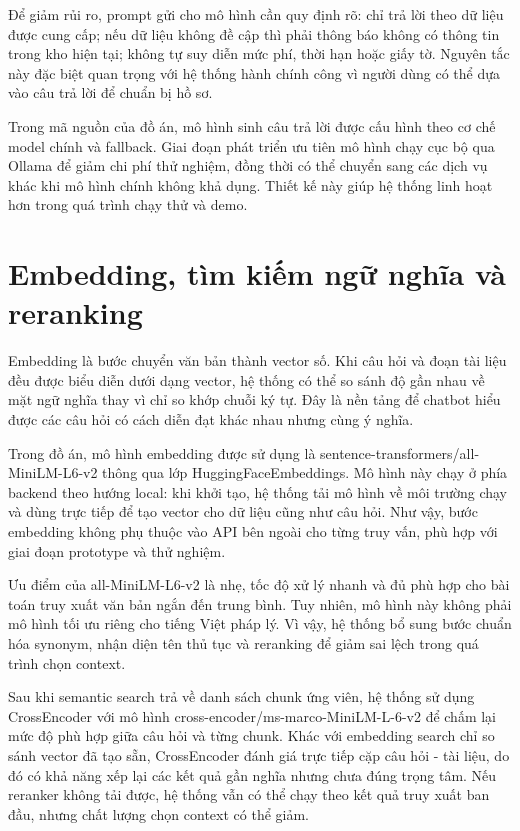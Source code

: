 Để giảm rủi ro, prompt gửi cho mô hình cần quy định rõ: chỉ trả lời theo
dữ liệu được cung cấp; nếu dữ liệu không đề cập thì phải thông báo không
có thông tin trong kho hiện tại; không tự suy diễn mức phí, thời hạn
hoặc giấy tờ. Nguyên tắc này đặc biệt quan trọng với hệ thống hành chính
công vì người dùng có thể dựa vào câu trả lời để chuẩn bị hồ sơ.

Trong mã nguồn của đồ án, mô hình sinh câu trả lời được cấu hình theo cơ
chế model chính và fallback. Giai đoạn phát triển ưu tiên mô hình chạy
cục bộ qua Ollama để giảm chi phí thử nghiệm, đồng thời có thể chuyển
sang các dịch vụ khác khi mô hình chính không khả dụng. Thiết kế này
giúp hệ thống linh hoạt hơn trong quá trình chạy thử và demo.

\section{Embedding, tìm kiếm ngữ nghĩa và
reranking}

Embedding là bước chuyển văn bản thành vector số. Khi câu hỏi và đoạn
tài liệu đều được biểu diễn dưới dạng vector, hệ thống có thể so sánh độ
gần nhau về mặt ngữ nghĩa thay vì chỉ so khớp chuỗi ký tự. Đây là nền
tảng để chatbot hiểu được các câu hỏi có cách diễn đạt khác nhau nhưng
cùng ý nghĩa.

Trong đồ án, mô hình embedding được sử dụng là
sentence-transformers/all-MiniLM-L6-v2 thông qua lớp
HuggingFaceEmbeddings. Mô hình này chạy ở phía backend theo hướng local:
khi khởi tạo, hệ thống tải mô hình về môi trường chạy và dùng trực tiếp
để tạo vector cho dữ liệu cũng như câu hỏi. Như vậy, bước embedding
không phụ thuộc vào API bên ngoài cho từng truy vấn, phù hợp với giai
đoạn prototype và thử nghiệm.

Ưu điểm của all-MiniLM-L6-v2 là nhẹ, tốc độ xử lý nhanh và đủ phù hợp
cho bài toán truy xuất văn bản ngắn đến trung bình. Tuy nhiên, mô hình
này không phải mô hình tối ưu riêng cho tiếng Việt pháp lý. Vì vậy, hệ
thống bổ sung bước chuẩn hóa synonym, nhận diện tên thủ tục và reranking
để giảm sai lệch trong quá trình chọn context.

Sau khi semantic search trả về danh sách chunk ứng viên, hệ thống sử
dụng CrossEncoder với mô hình cross-encoder/ms-marco-MiniLM-L-6-v2 để
chấm lại mức độ phù hợp giữa câu hỏi và từng chunk. Khác với embedding
search chỉ so sánh vector đã tạo sẵn, CrossEncoder đánh giá trực tiếp
cặp câu hỏi - tài liệu, do đó có khả năng xếp lại các kết quả gần nghĩa
nhưng chưa đúng trọng tâm. Nếu reranker không tải được, hệ thống vẫn có
thể chạy theo kết quả truy xuất ban đầu, nhưng chất lượng chọn context
có thể giảm.

